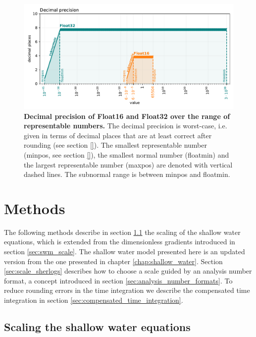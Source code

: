 \begin{figure}[tbhp]
	\includegraphics[width=1\textwidth]{Figures/a64fx/float32_16_decprec.pdf}
	\caption{\textbf{Decimal precision of Float16 and Float32 over the range of representable numbers.}
	The decimal precision is worst-case, i.e. given in terms of decimal places that are at least correct after rounding (see section \ref{}).
	The smallest representable number (minpos, see section \ref{}), the smallest normal number (floatmin) and the largest representable number
	(maxpos) are denoted with vertical dashed lines. The subnormal range is between minpos and floatmin.}
	\label{fig:a64fx_decprec}
\end{figure}

\section{Methods}
\label{sec:hardware_methods}

 The following methods describe in section \ref{sec:swm_scaling} the scaling of the shallow water equations, which is extended from 
 the dimensionless gradients introduced in section \ref{sec:swm_scale}. The shallow water model presented here is an updated
 version from the one presented in chapter \ref{chap:shallow_water}. Section \ref{sec:scale_sherlogs} describes how to choose a scale
 guided by an analysis number format, a concept introduced in section \ref{sec:analysis_number_formats}. To reduce rounding errors
 in the time integration we describe the compensated time integration in section \ref{sec:compensated_time_integration}.

\subsection{Scaling the shallow water equations}
\label{sec:swm_scaling}

